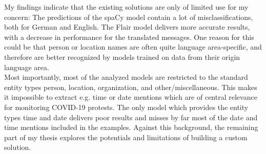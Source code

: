 My findings indicate that the existing solutions are only of limited use for my concern: The predictions of the spaCy model contain a lot of misclassifications, both for German and English. The Flair model delivers more accurate results, with a decrease in performance for the translated messages. One reason for this could be that person or location names are often quite language area-specific, and therefore are better recognized by models trained on data from their origin language area.\\
Most importantly, most of the analyzed models are restricted to the standard entity types person, location, organization, and other/miscellaneous. This makes it impossible to extract e.g. time or date mentions which are of central relevance for monitoring COVID-19 protests. The only model which provides the entity types time and date delivers poor results and misses by far most of the date and time mentions included in the examples.
Against this background, the remaining part of my thesis explores the potentials and limitations of building  a custom solution. 
